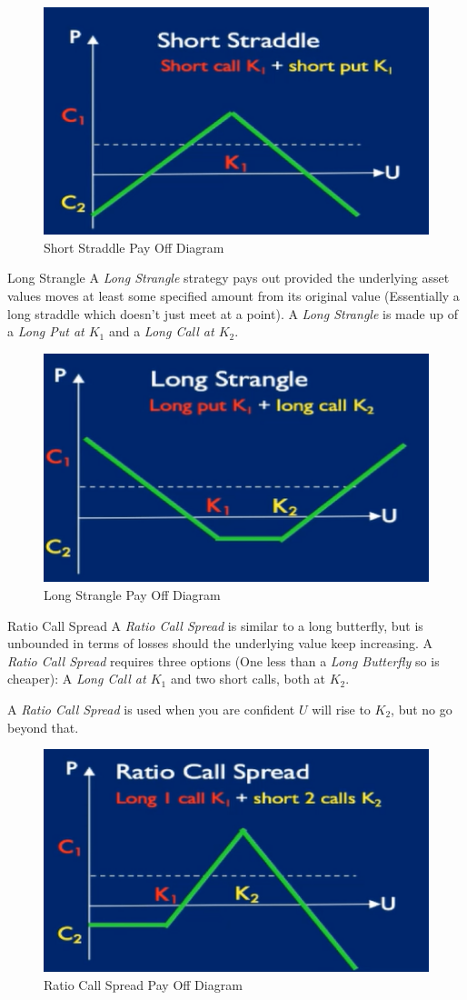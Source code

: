 \documentclass[11pt,a4paper]{article}
\begin{document}
\begin{figure}[ht!]
  \centering
  \includegraphics[width=.5\textwidth]{shortStraddle.PNG}
  \caption{Short  Straddle Pay Off Diagram}
\end{figure}

\begin{definition}{Long Strangle}
  A \textit{Long Strangle} strategy pays out provided the underlying asset values moves at least some specified amount from its original value (Essentially a long straddle which doesn't just meet at a point). A \textit{Long Strangle} is made up of a \textit{Long Put at $K_1$} and a \textit{Long Call at $K_2$}.
\end{definition}

\begin{figure}[ht!]
  \centering
  \includegraphics[width=.5\textwidth]{longStrangle.PNG}
  \caption{Long Strangle  Pay Off Diagram}
\end{figure}

\begin{definition}{Ratio Call Spread}
  A \textit{Ratio Call Spread} is similar to a long butterfly, but is unbounded in terms of losses should the underlying value keep increasing. A \textit{Ratio Call Spread} requires three options (One less than a \textit{Long Butterfly} so is cheaper): A \textit{Long Call at $K_1$} and two short calls, both at $K_2$.
  \par A \textit{Ratio Call Spread} is used when you are confident $U$ will rise to $K_2$, but no go beyond that.
\end{definition}

\begin{figure}[ht!]
  \centering
  \includegraphics[width=.5\textwidth]{ratioCallSpread.PNG}
  \caption{Ratio Call Spread Pay Off Diagram}
\end{figure}
\end{document}
